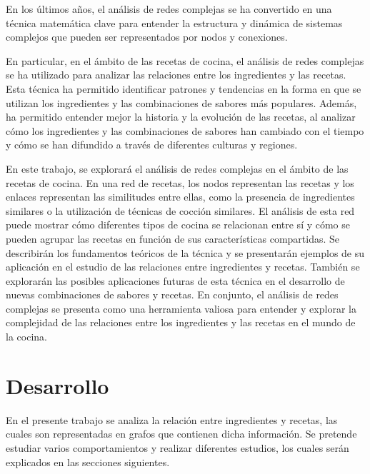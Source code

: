 \documentclass[a4paper]{article}
\begin{document}
En los últimos años, el análisis de redes complejas se ha convertido en una
técnica matemática clave para entender la estructura y dinámica de sistemas
complejos que pueden ser representados por nodos y conexiones.

En particular, en el ámbito de las recetas de cocina, el análisis de redes
complejas se ha utilizado para analizar las relaciones entre los ingredientes y
las recetas. Esta técnica ha permitido identificar patrones y tendencias en la
forma en que se utilizan los ingredientes y las combinaciones de sabores más
populares. Además, ha permitido entender mejor la historia y la evolución de las
recetas, al analizar cómo los ingredientes y las combinaciones de sabores han
cambiado con el tiempo y cómo se han difundido a través de diferentes culturas y
regiones. \cite{ahn, herrera}

En este trabajo, se explorará el análisis de redes complejas en el ámbito de las
recetas de cocina. En una red de recetas, los nodos representan las recetas y
los enlaces representan las similitudes entre ellas, como la presencia de
ingredientes similares o la utilización de técnicas de cocción similares. El
análisis de esta red puede mostrar cómo diferentes tipos de cocina se relacionan
entre sí y cómo se pueden agrupar las recetas en función de sus características
compartidas. Se describirán los fundamentos teóricos de la técnica y se
presentarán ejemplos de su aplicación en el estudio de las relaciones entre
ingredientes y recetas. También se explorarán las posibles aplicaciones futuras
de esta técnica en el desarrollo de nuevas combinaciones de sabores y recetas.
En conjunto, el análisis de redes complejas se presenta como una herramienta
valiosa para entender y explorar la complejidad de las relaciones entre los
ingredientes y las recetas en el mundo de la cocina.




\section{Desarrollo}\label{sec:dev}
En el presente trabajo se analiza la relación entre ingredientes y recetas,
las cuales son representadas en grafos que contienen dicha información. Se
pretende estudiar varios comportamientos y realizar diferentes estudios, los
cuales serán explicados en las secciones siguientes. 
\end{document}
